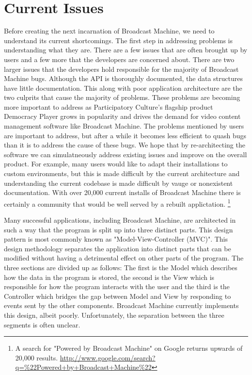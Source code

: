 \documentclass[a4paper,12pt]{report}
\begin{document}
\chapter{Current Issues}
Before creating the next incarnation of Broadcast Machine, we need to understand its current shortcomings.
The first step in addressing problems is understanding what they are.
There are a few issues that are often brought up by users and a few more that the developers are concerned about.
There are two larger issues that the developers hold responsible for the majority of Broadcast Machine bugs.
Although the API is thoroughly documented, the data structures have little documentation.
This along with poor application architecture are the two culprits that cause the majority of problems.
These problems are becoming more important to address as Participatory Culture's flagship product Democracy Player grows in popularity and drives the demand for video content management software like Broadcast Machine.
The problems mentioned by users are important to address, but after a while it becomes less efficient to quash bugs than it is to address the cause of these bugs.
We hope that by re-architecting the software we can simulatneously address existing issues and improve on the overall product.
For example, many users would like to adapt their installations to custom environments, but this is made difficult by the current architecture and understanding the current codebase is made difficult by vauge or nonexistent documentation.
With over 20,000 current installs of Broadcast Machine there is certainly a community that would be well served by a rebuilt applictation. \footnote{A search for "Powered by Broadcast Machine" on Google returns upwards of 20,000 results. \url{ http://www.google.com/search?q=\%22Powered+by+Broadcast+Machine\%22}}

Many successful applications, including Broadcast Machine, are architected in such a way that the program is split up into three distinct parts.
This design pattern is most commonly known as "Model-View-Controller (MVC)".
This design methodology separates the application into distinct parts that can be modified without having a detrimental effect on other parts of the program.
The three sections are divided up as follows: The first is the Model which describes how the data in the program is stored, the second is the View which is responsible for how the program interacts with the user and the third is the Controller which bridges the gap between Model and View by responding to events sent by the other components.
Broadcast Machine currently implements this design, albeit poorly.
Unfortunately, the separation between the three segments is often unclear.
    
\end{document}
